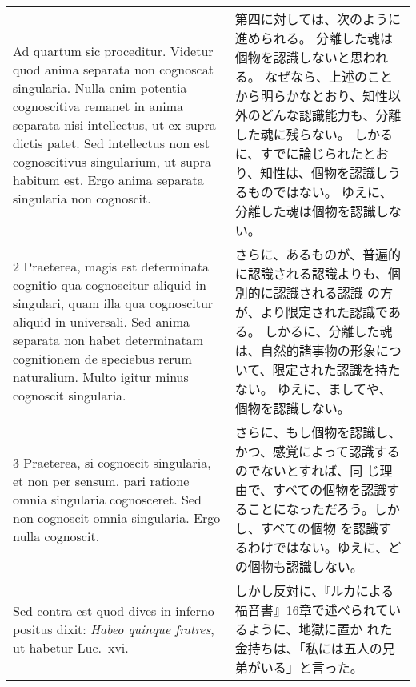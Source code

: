 \documentclass[10pt]{jsarticle} %
\begin{document}
\begin{longtable}{p{21em}p{21em}}
{\huge A}{\sc d quartum sic proceditur}. Videtur quod
 anima separata non cognoscat singularia. Nulla enim potentia
 cognoscitiva remanet in anima separata nisi intellectus, ut ex supra
 dictis patet. Sed intellectus non est cognoscitivus singularium, ut
 supra habitum est. Ergo anima separata singularia non cognoscit.


&
第四に対しては、次のように進められる。
分離した魂は個物を認識しないと思われる。
なぜなら、上述のことから明らかなとおり、知性以外のどんな認識能力も、分離
 した魂に残らない。
しかるに、すでに論じられたとおり、知性は、個物を認識しうるものではない。
ゆえに、分離した魂は個物を認識しない。


\\




2 {\sc Praeterea}, magis est determinata cognitio
 qua cognoscitur aliquid in singulari, quam illa qua cognoscitur aliquid
 in universali. Sed anima separata non habet determinatam cognitionem de
 speciebus rerum naturalium. Multo igitur minus cognoscit singularia.


&


さらに、あるものが、普遍的に認識される認識よりも、個別的に認識される認識
 の方が、より限定された認識である。
しかるに、分離した魂は、自然的諸事物の形象について、限定された認識を持た
 ない。
ゆえに、ましてや、個物を認識しない。

\\





3 {\sc Praeterea}, si cognoscit singularia, et non
 per sensum, pari ratione omnia singularia cognosceret. Sed non
 cognoscit omnia singularia. Ergo nulla cognoscit.


&


さらに、もし個物を認識し、かつ、感覚によって認識するのでないとすれば、同
 じ理由で、すべての個物を認識することになっただろう。しかし、すべての個物
 を認識するわけではない。ゆえに、どの個物も認識しない。
\\





{\sc Sed contra est} quod dives in inferno
 positus dixit: {\it Habeo quinque fratres}, ut habetur Luc.~{\sc xvi}.


&

しかし反対に、『ルカによる福音書』16章で述べられているように、地獄に置か
 れた金持ちは、「私には五人の兄弟がいる」と言った。


\end{longtable}
\end{document}
